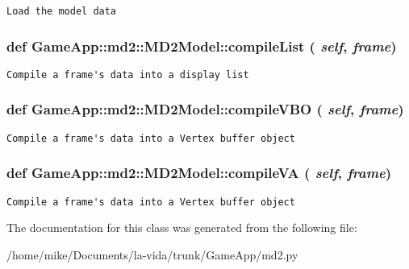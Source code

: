 \footnotesize\begin{verbatim}Load the model data \end{verbatim}
\normalsize
 \hypertarget{classGameApp_1_1md2_1_1MD2Model_58844d458c4a62763164a13728e607e6}{
\subsubsection[compileList]{\setlength{\rightskip}{0pt plus 5cm}def GameApp::md2::MD2Model::compileList ( {\em self}, \/   {\em frame})}}
\label{classGameApp_1_1md2_1_1MD2Model_58844d458c4a62763164a13728e607e6}




\footnotesize\begin{verbatim}Compile a frame's data into a display list \end{verbatim}
\normalsize
 \hypertarget{classGameApp_1_1md2_1_1MD2Model_fb3e1caee5b759ca1ed6fcf1d72a5042}{
\subsubsection[compileVBO]{\setlength{\rightskip}{0pt plus 5cm}def GameApp::md2::MD2Model::compileVBO ( {\em self}, \/   {\em frame})}}
\label{classGameApp_1_1md2_1_1MD2Model_fb3e1caee5b759ca1ed6fcf1d72a5042}




\footnotesize\begin{verbatim}Compile a frame's data into a Vertex buffer object \end{verbatim}
\normalsize
 \hypertarget{classGameApp_1_1md2_1_1MD2Model_1eab56441e822f92e54a95eebd2aa083}{
\subsubsection[compileVA]{\setlength{\rightskip}{0pt plus 5cm}def GameApp::md2::MD2Model::compileVA ( {\em self}, \/   {\em frame})}}
\label{classGameApp_1_1md2_1_1MD2Model_1eab56441e822f92e54a95eebd2aa083}




\footnotesize\begin{verbatim}Compile a frame's data into a Vertex buffer object \end{verbatim}
\normalsize
 

The documentation for this class was generated from the following file:\begin{CompactItemize}
\item 
/home/mike/Documents/la-vida/trunk/GameApp/md2.py\end{CompactItemize}
